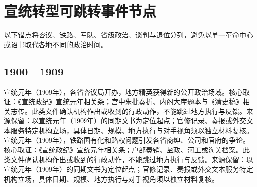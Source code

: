 \section{宣统转型可跳转事件节点}
以下锚点将咨议、铁路、军队、省级政治、谈判与退位分列，避免以单一革命中心或诏书取代各地不同的政治时间。
\subsection{1900—1909}
宣统元年（1909年），各省咨议局开办，地方精英获得新的公开政治场域。核心取证：《宣统政纪》宣统元年相关条；宫中朱批奏折、内阁大库题本与《清史稿》相关志传。此类文件确认机构作出或收到的行政动作，不能跳过地方执行与反馈。来源保留：以宣统元年（1909年）的同期文书为定位起点；官修记录、奏报或外交文本服务特定机构立场，具体日期、规模、地方执行与对手视角须以独立材料复核。
宣统元年（1909年），铁路国有化和路权问题引发各省商绅、公司和官府的争论。核心取证：《宣统政纪》宣统元年相关条；户部奏销、盐政、河工或海关档案。此类文件确认机构作出或收到的行政动作，不能跳过地方执行与反馈。来源保留：以宣统元年（1909年）的同期文书为定位起点；官修记录、奏报或外交文本服务特定机构立场，具体日期、规模、地方执行与对手视角须以独立材料复核。
